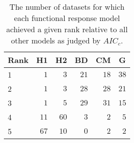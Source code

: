 \begin{table}[!tbp]
\caption{The number of datasets for which each functional response model achieved a given rank relative to all other models as judged by $AIC_c$.\label{table:AICc_rankings}} 
\begin{center}
\begin{tabular}{lrrrrr}
\hline\hline
\multicolumn{1}{l}{Rank}&\multicolumn{1}{c}{H1}&\multicolumn{1}{c}{H2}&\multicolumn{1}{c}{BD}&\multicolumn{1}{c}{CM}&\multicolumn{1}{c}{G}\tabularnewline
\hline
1&$ 1$&$ 3$&$21$&$18$&$38$\tabularnewline
2&$ 1$&$ 3$&$28$&$28$&$21$\tabularnewline
3&$ 1$&$ 5$&$29$&$31$&$15$\tabularnewline
4&$11$&$60$&$ 3$&$ 2$&$ 5$\tabularnewline
5&$67$&$10$&$ 0$&$ 2$&$ 2$\tabularnewline
\hline
\end{tabular}\end{center}
\end{table}
